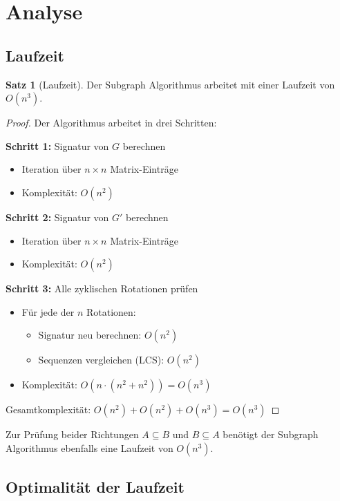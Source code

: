 ﻿\documentclass[a4paper,12pt]{article}
\theoremstyle{definition}
\newtheorem{satz}{Satz}
\begin{document}
\section{Analyse}

\subsection{Laufzeit}

\begin{satz}[Laufzeit]
	Der Subgraph Algorithmus arbeitet mit einer Laufzeit von $O(n^3)$.
\end{satz}

\begin{proof}
	Der Algorithmus arbeitet in drei Schritten:
	
	\textbf{Schritt 1:} Signatur von $G$ berechnen
	\begin{itemize}
		\item Iteration über $n \times n$ Matrix-Einträge
		\item Komplexität: $O(n^2)$
	\end{itemize}
	
	\textbf{Schritt 2:} Signatur von $G'$ berechnen
	\begin{itemize}
		\item Iteration über $n \times n$ Matrix-Einträge
		\item Komplexität: $O(n^2)$
	\end{itemize}
	
	\textbf{Schritt 3:} Alle zyklischen Rotationen prüfen
	\begin{itemize}
		\item Für jede der $n$ Rotationen:
		\begin{itemize}
			\item Signatur neu berechnen: $O(n^2)$
			\item Sequenzen vergleichen (LCS): $O(n^2)$
		\end{itemize}
		\item Komplexität: $O(n \cdot (n^2 + n^2)) = O(n^3)$
	\end{itemize}
	
	Gesamtkomplexität: $O(n^2) + O(n^2) + O(n^3) = O(n^3)$
\end{proof}

Zur Prüfung beider Richtungen $A \subseteq B$ und $B \subseteq A$ benötigt der Subgraph Algorithmus ebenfalls eine Laufzeit von $O(n^3)$.

\subsection{Optimalität der Laufzeit}
\end{document}
